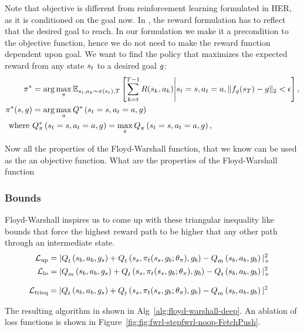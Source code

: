 Note that objective is different from reinforcement learning formulated in HER,
as it is conditioned on the goal now. In \citet{andrychowicz2016learning}, the
reward formulation has to reflect that the desired goal to reach. In our formulation
we make it a precondition to the objective function, hence we do not need to
make the reward function dependent upon goal.
We want to find the policy that maximizes the expected reward from any
state $\state_t$ to a desired goal $\goal$:
%
\begin{align}
  \policy^* &=
\arg \max_{\policy} \E_{\state_t, \act_k \sim \policy(\state_t), T}\left[ \sum_{k=t}^{T-1} \Rew(\state_k, \act_k) \middle\vert \state_t = \state, \act_t = \act, \|f_\goal(\state_T) - \goal\|_2 < \epsilon \right],
  \\
  \policy^*(\state, \goal) &= \arg \max_{\act} \fwargs{\state_t = \state}{\act_t = \act}{\goal}{}{*}\\
\text{where } &\fwargs{\state_t = \state}{\act_t = \act}{\goal}{\policy}{*} = 
\max_{\policy} \fwargs{\state_t = \state}{\act_t = \act}{\goal}{\policy}{},
\end{align}%
%

Now all the properties of the Floyd-Warshall function, that we know can be used
as the an objective function.
What are the properties of the Floyd-Warshall
function

\subsubsection{Bounds}
Floyd-Warshall inspires us to come up with these triangular inequality like
bounds that force the highest reward path to be higher that any other path
through an intermediate state.
%
\begin{align}
  \LossUp &= |
      \fwargs{\state_{b}}{\act_b}{\goal_s}{t}{}
      + \fwargs{\state_{s}}{\policy_t(\state_s, \goal_{b};\param_\policy)}{\goal_b}{t}{}
      - \fwargs{\state_{b}}{\act_b}{\goal_b}{m}{}
      |_+^2
                         \\
  \LossLo &= |
      \fwargs{\state_{b}}{\act_b}{\goal_s}{m}{}
      + \fwargs{\state_{s}}{\policy_t(\state_s, \goal_{b};\param_\policy)}{\goal_b}{t}{}
      - \fwargs{\state_{b}}{\act_b}{\goal_b}{t}{}
      |_+^2
\end{align}%
% 

\begin{align}
  \LossTrieq &= |
      \fwargs{\state_{b}}{\act_b}{\goal_s}{t}{}
      + \fwargs{\state_{s}}{\policy_t(\state_s, \goal_{b};\param_\policy)}{\goal_b}{t}{}
      - \fwargs{\state_{b}}{\act_b}{\goal_b}{m}{}
      |^2
\end{align}

The resulting algorithm in shown in Alg~\ref{alg:floyd-warshall-deep}. An
ablation of loss functions is shown in Figure~\ref{fig:fig:fwrl-stepfwrl-noop-FetchPush}.


